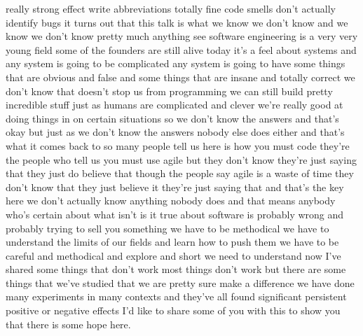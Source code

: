 \documentclass[conference, compsoc, twoside]{IEEEtran}
\begin{document}
really strong effect write abbreviations
totally fine code smells don't actually
identify bugs it turns out that this
talk is what we know we don't know and
we know we don't know pretty much
anything see software engineering is a
very very young field some of the
founders are still alive today it's a
feel about systems and any system is
going to be complicated any system is going to have some things
that are obvious and false and some
things that are insane and totally
correct we don't know that doesn't stop
us from programming we can still build
pretty incredible stuff just as humans
are complicated and clever we're really
good at doing things in on certain
situations so we don't know the answers
and that's okay but just as we don't
know the answers nobody else does either
and that's what it comes back to so many
people tell us here is how you must code
they're the people who tell us you must
use agile but they don't know they're
just saying that they just do believe
that though the people say agile is a
waste of time they don't know that they
just believe it they're just saying that
and that's the key here we don't
actually know anything nobody does and
that means anybody who's certain about
what isn't is it true about software is
probably wrong and probably trying to
sell you something we have to be
methodical we have to understand the
limits of our fields and learn how to
push them we have to be careful and
methodical and explore and short we need
to understand now I've shared some
things that don't work most things don't
work but there are some things that
we've studied that we are pretty sure
make a difference we have done many
experiments in many contexts and they've
all found significant persistent
positive or negative effects I'd like to
share some of you with this to show you
that there is some hope here.
\end{document}
